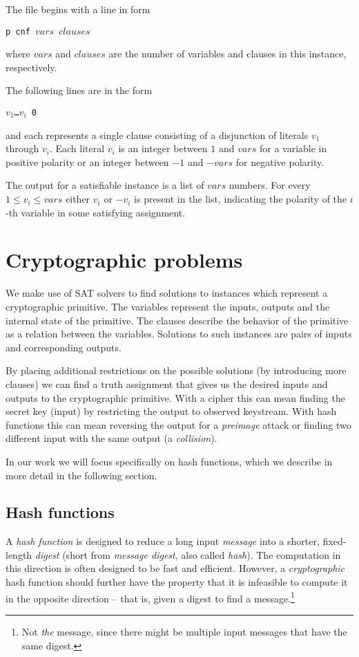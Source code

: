 The file begins with a line in form

\centerline{\texttt{p cnf $vars$ $clauses$}}

\noindent where $vars$ and $clauses$ are the number of variables and clauses in this instance, respectively.

The following lines are in the form

\centerline{\texttt{$v_1$\dots$v_i$ 0}}

\noindent and each represents a single clause consisting of a disjunction of literals $v_1$ through $v_i$.
Each literal $v_i$ is an integer between $1$ and $vars$ for a variable in positive polarity or an integer between $-1$ and $-vars$ for negative polarity.

The output for a satisfiable instance is a list of $vars$ numbers.
For every $1 \le v_i \le vars$ either $v_i$ or $-v_i$ is present in the list, indicating the polarity of the $i$-th variable in some satisfying assignment. 

\section{Cryptographic problems}
We make use of SAT solvers to find solutions to instances which represent a cryptographic primitive.
The variables represent the inputs, outputs and the internal state of the primitive.
The clauses describe the behavior of the primitive as a relation between the variables.
Solutions to such instances are pairs of inputs and corresponding outputs.

By placing additional restrictions on the possible solutions (by introducing more clauses) we can find a truth assignment that gives us the desired inputs and outputs to the cryptographic primitive.
With a cipher this can mean finding the secret key (input) by restricting the output to observed keystream.
With hash functions this can mean reversing the output for a \emph{preimage} attack or finding two different input with the same output (a \emph{collision}).

In our work we will focus specifically on hash functions, which we describe in more detail in the following section.

\subsection{Hash functions}
\label{sec:hash-functions}
A \emph{hash function} is designed to reduce a long input \emph{message} into a shorter, fixed-length \emph{digest} (short from \emph{message digest}, also called \emph{hash}).
The computation in this direction is often designed to be fast and efficient.
However, a \emph{cryptographic} hash function should further have the property that it is infeasible to compute it in the opposite direction -- that is, given a digest to find a message.\footnote{Not \emph{the} message, since there might be multiple input messages that have the same digest.}


